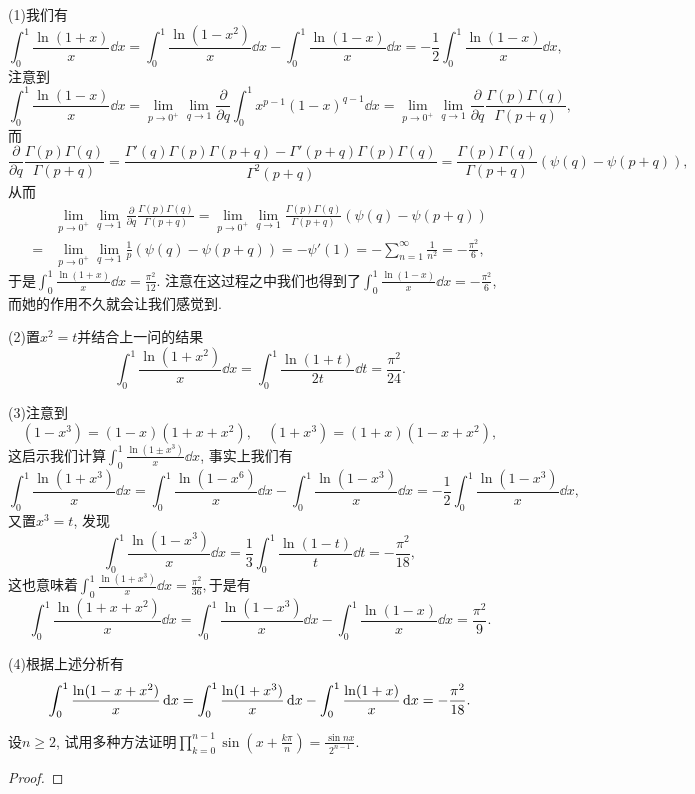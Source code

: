\begin{quiza}
\begin{solution}
(1)我们有\[\int_{0}^{1}\frac{\ln(1+x)}{x}\dd x=\int_{0}^{1}\frac{\ln(1-x^2)}{x}\dd x-\int_{0}^{1}\frac{\ln(1-x)}{x}\dd x=-\frac{1}{2}\int_{0}^{1}\frac{\ln(1-x)}{x}\dd x,\]注意到\[\int_{0}^{1}\frac{\ln(1-x)}{x}\dd x=\lim_{p\rightarrow 0^+}\lim_{q\rightarrow 1}\frac{\partial}{\partial q}\int_{0}^{1}x^{p-1}(1-x)^{q-1}\dd x=\lim_{p\rightarrow 0^+}\lim_{q\rightarrow 1}\frac{\partial}{\partial q}\frac{\Gamma(p)\Gamma(q)}{\Gamma(p+q)},\]而\[\frac{\partial}{\partial q}\frac{\Gamma(p)\Gamma(q)}{\Gamma(p+q)}=\frac{\Gamma'(q)\Gamma(p)\Gamma(p+q)-\Gamma'(p+q)\Gamma(p)\Gamma(q)}{\Gamma^2(p+q)}=\frac{\Gamma(p)\Gamma(q)}{\Gamma(p+q)}\left(\psi(q)-\psi(p+q)\right),\]从而
\[\begin{split}
	&\lim_{p\rightarrow 0^+}\lim_{q\rightarrow 1}\frac{\partial}{\partial q}\frac{\Gamma(p)\Gamma(q)}{\Gamma(p+q)}=\lim_{p\rightarrow 0^+}\lim_{q\rightarrow 1}\frac{\Gamma(p)\Gamma(q)}{\Gamma(p+q)}\left(\psi(q)-\psi(p+q)\right)\\=&\lim_{p\rightarrow 0^+}\lim_{q\rightarrow 1}\frac{1}{p}\left(\psi(q)-\psi(p+q)\right)=-\psi'(1)=-\sum_{n=1}^{\infty}\frac{1}{n^2}=-\frac{\pi^2}{6},
\end{split}\]
于是\(\int_{0}^{1}\frac{\ln(1+x)}{x}\dd x=\frac{\pi^2}{12}.\) 注意在这过程之中我们也得到了\(\int_{0}^{1}\frac{\ln(1-x)}{x}\dd x=-\frac{\pi^2}{6}\), 而她的作用不久就会让我们感觉到.

(2)置\(x^2=t\)并结合上一问的结果\[\int_{0}^{1}\frac{\ln(1+x^2)}{x}\dd x=\int_{0}^{1}\frac{\ln(1+t)}{2t}\dd t=\frac{\pi^2}{24}.\]

(3)注意到\[(1-x^3)=(1-x)(1+x+x^2),\quad (1+x^3)=(1+x)(1-x+x^2),\]这启示我们计算\(\int_{0}^{1}\frac{\ln(1\pm x^3)}{x}\dd x\), 事实上我们有\[\int_{0}^{1}\frac{\ln(1+x^3)}{x}\dd x=\int_{0}^{1}\frac{\ln(1-x^6)}{x}\dd x-\int_{0}^{1}\frac{\ln(1-x^3)}{x}\dd x=-\frac{1}{2}\int_{0}^{1}\frac{\ln(1-x^3)}{x}\dd x,\]又置\(x^3=t\), 发现\[\int_{0}^{1}\frac{\ln(1-x^3)}{x}\dd x=\frac{1}{3}\int_{0}^{1}\frac{\ln(1-t)}{t}\dd t=-\frac{\pi^2}{18},\]这也意味着\(\int_{0}^{1}\frac{\ln(1+x^3)}{x}\dd x=\frac{\pi^2}{36},\)于是有\[\int_{0}^{1}\frac{\ln(1+x+x^2)}{x}\dd x=\int_{0}^{1}\frac{\ln(1-x^3)}{x}\dd x-\int_{0}^{1}\frac{\ln(1-x)}{x}\dd x=\frac{\pi^2}{9}.\]

(4)根据上述分析有\[\int_{0}^{1}\frac{\ln(1-x+x^2)}{x}\,\mathrm{d} x=\int_{0}^{1}\frac{\ln(1+x^3)}{x}\,\mathrm{d} x-\int_{0}^{1}\frac{\ln(1+x)}{x}\,\mathrm{d} x=-\frac{\pi^2}{18}.\qedhere\]
\end{solution}
\woe 设\(n\geqslant 2\), 试用多种方法证明\(\prod_{k=0}^{n-1}\sin(x+\frac{k\pi}{n})=\frac{\sin nx}{2^{n-1}}\).
\begin{proof}
	

\end{proof}
\end{quiza}
